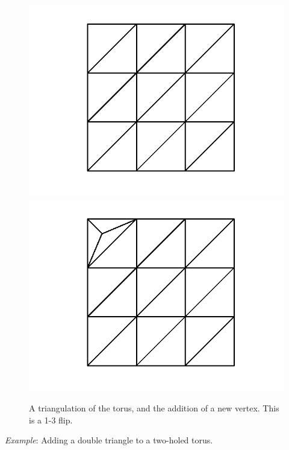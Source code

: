 \documentclass[12pt]{article}
\begin{document}
\begin{figure}[ht]
\includegraphics[scale = 0.5]{Pictures/torus22.png}
\includegraphics[scale = 0.5]{Pictures/torus2addvertex2.png}
\caption{A triangulation of the torus, and the addition of a new vertex. This is a 1-3 flip.}
\label{torusaddv}
\end{figure}

 \textit{Example}: Adding a double triangle to a two-holed torus.
\end{document}
